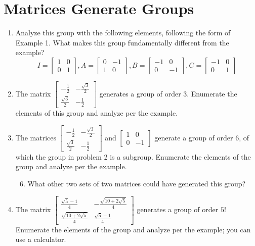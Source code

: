 \documentclass[../gatm_answers.tex]{subfiles}
\begin{document}
\section{Matrices Generate Groups}

\begin{enumerate}
\item Analyze this group with the following elements, following the form of Example 1. What makes this group fundamentally different from the example?
$$I=\left[\begin{array}{cc} 1 & 0 \\ 0 & 1 \end{array}\right], A=\left[\begin{array}{cc} 0 & -1 \\ 1 & 0 \end{array}\right], B=\left[\begin{array}{cc} -1 & 0 \\ 0 & -1 \end{array}\right], C=\left[\begin{array}{cc} -1 & 0 \\ 0 & 1 \end{array}\right]$$
\item The matrix $\left[\begin{array}{cc} -\frac{1}{2} & -\frac{\sqrt{3}}{2} \\ \frac{\sqrt{3}}{2} & -\frac{1}{2}\end{array}\right]$ generates a group of order $3$. Enumerate the elements of this group and analyze per the example.
\item The matrices $\left[\begin{array}{cc} -\frac{1}{2} & -\frac{\sqrt{3}}{2} \\ \frac{\sqrt{3}}{2} & -\frac{1}{2}\end{array}\right]$ and $\left[\begin{array}{cc} 1 & 0 \\ 0 & -1 \end{array}\right]$ generate a group of order $6$, of which the group in problem 2 is a subgroup. Enumerate the elements of the group and analyze per the example.
\begin{enumerate}
\setcounter{enumii}{5}
\item What other two sets of two matrices could have generated this group?
\end{enumerate}
\item The matrix $\left[\begin{array}{cc} \frac{\sqrt{5}-1}{4} & -\frac{\sqrt{10+2\sqrt{5}}}{4} \\ \frac{\sqrt{10+2\sqrt{5}}}{4} & \frac{\sqrt{5}-1}{4} \end{array}\right]$ generates a group of order $5$! Enumerate the elements of the group and analyze per the example; you can use a calculator.

\end{enumerate}
\end{document}
